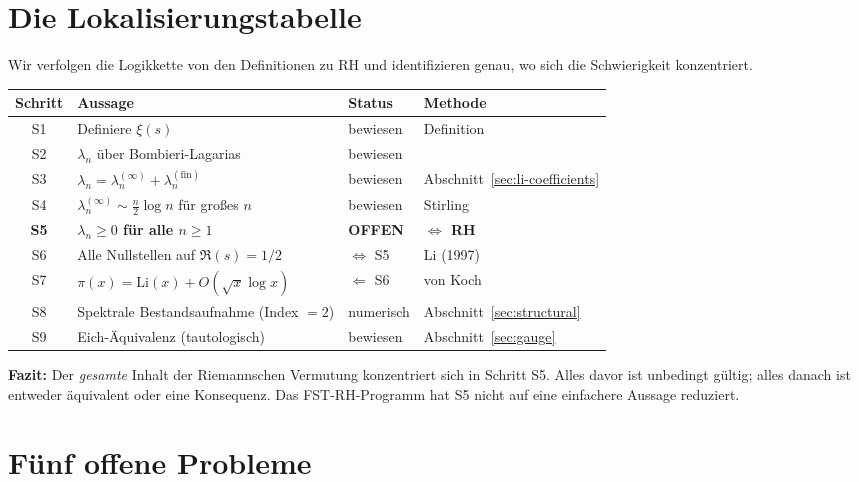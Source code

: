 \documentclass[12pt,a4paper]{article}
\theoremstyle{definition}
\theoremstyle{remark}
\begin{document}
\section{Die Lokalisierungstabelle}
\label{sec:localization}

Wir verfolgen die Logikkette von den Definitionen zu RH und identifizieren genau, wo sich die Schwierigkeit konzentriert.

\begin{center}
\renewcommand{\arraystretch}{1.2}
\begin{tabular}{c|l|l|l}
\textbf{Schritt} & \textbf{Aussage} & \textbf{Status} & \textbf{Methode} \\\hline
S1 & Definiere $\xi(s)$ & bewiesen & Definition \\
S2 & $\lambda_n$ über Bombieri-Lagarias & bewiesen & \cite{BombieriLagarias1999} \\
S3 & $\lambda_n = \lambda_n^{(\infty)} + \lambda_n^{(\mathrm{fin})}$ & bewiesen & Abschnitt~\ref{sec:li-coefficients} \\
S4 & $\lambda_n^{(\infty)} \sim \frac{n}{2}\log n$ für großes $n$ & bewiesen & Stirling \\
\textbf{S5} & \textbf{$\lambda_n \geq 0$ für alle $n \geq 1$} & \textbf{OFFEN} & \textbf{$\Longleftrightarrow$ RH} \\
S6 & Alle Nullstellen auf $\Re(s) = 1/2$ & $\Leftrightarrow$ S5 & Li (1997) \\
S7 & $\pi(x) = \mathrm{Li}(x) + O(\sqrt{x}\log x)$ & $\Leftarrow$ S6 & von Koch \\
S8 & Spektrale Bestandsaufnahme (Index $= 2$) & numerisch & Abschnitt~\ref{sec:structural} \\
S9 & Eich-Äquivalenz (tautologisch) & bewiesen & Abschnitt~\ref{sec:gauge} \\
\end{tabular}
\end{center}

\noindent\textbf{Fazit:} Der \emph{gesamte} Inhalt der Riemannschen Vermutung konzentriert sich in Schritt S5. Alles davor ist unbedingt gültig; alles danach ist entweder äquivalent oder eine Konsequenz. Das FST-RH-Programm hat S5 nicht auf eine einfachere Aussage reduziert.


\section{Fünf offene Probleme}
\label{sec:open-problems}
\end{document}
